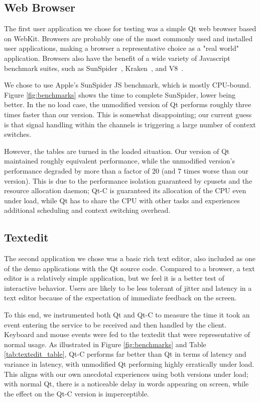 \documentclass[letterpaper,twocolumn,11pt]{article}
\begin{document}
\subsection{Web Browser}

The first user application we chose for testing was a simple Qt web browser based on WebKit. Browsers are probably one of the most commonly used and installed user applications, making a browser a representative choice as a "real world" application. Browsers also have the benefit of a wide variety of Javascript benchmark suites, such as SunSpider~\cite{sunspider}, Kraken~\cite{kraken}, and V8~\cite{v8benchmark}.

We chose to use Apple's SunSpider JS benchmark, which is mostly CPU-bound. Figure \ref{fig:benchmarks} shows the time to complete SunSpider, lower being better. In the no load case, the unmodified version of Qt performs roughly three times faster than our version. This is somewhat disappointing; our current guess is that signal handling within the channels is triggering a large number of context switches.

However, the tables are turned in the loaded situation. Our version of Qt maintained roughly equivalent performance, while the unmodified version's performance degraded by more than a factor of 20 (and 7 times worse than our version). This is due to the performance isolation guaranteed by cpusets and the resource allocation daemon; Qt-C is guaranteed its allocation of the CPU even under load, while Qt has to share the CPU with other tasks and experiences additional scheduling and context switching overhead.

\subsection{Textedit}

The second application we chose was a basic rich text editor, also included as one of the demo applications with the Qt source code. Compared to a browser, a text editor is a relatively simple application, but we feel it is a better test of interactive behavior. Users are likely to be less tolerant of jitter and latency in a text editor because of the expectation of immediate feedback on the screen. 

To this end, we instrumented both Qt and Qt-C to measure the time it took an event entering the service to be received and then handled by the client. Keyboard and mouse events were fed to the textedit that were representative of normal usage. As illustrated in Figure \ref{fig:benchmarks} and Table \ref{tab:textedit_table}, Qt-C performs far better than Qt in terms of latency and variance in latency, with unmodified Qt performing highly erratically under load. This aligns with our own anecdotal experiences using both versions under load; with normal Qt, there is a noticeable delay in words appearing on screen, while the effect on the Qt-C version is imperceptible.
\end{document}
